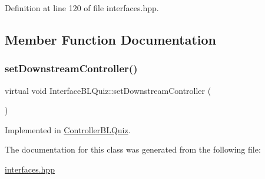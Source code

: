 Definition at line 120 of file interfaces.\+hpp.



\subsection{Member Function Documentation}
\mbox{\label{class_interface_b_l_quiz_aa2af7b48e4caf5ecdf446f64a351c86f}} 
\subsubsection{\texorpdfstring{set\+Downstream\+Controller()}{setDownstreamController()}}
{\footnotesize\ttfamily virtual void Interface\+B\+L\+Quiz\+::set\+Downstream\+Controller (\begin{DoxyParamCaption}\item[{\hyperlink{class_stub_p_r}{Stub\+PR} $\ast$}]{ }\end{DoxyParamCaption})\hspace{0.3cm}{\ttfamily [pure virtual]}}



Implemented in \hyperlink{class_controller_b_l_quiz_a77ada4c0f633482129e9179e24f6f2a8}{Controller\+B\+L\+Quiz}.



The documentation for this class was generated from the following file\+:\begin{DoxyCompactItemize}
\item 
\hyperlink{interfaces_8hpp}{interfaces.\+hpp}\end{DoxyCompactItemize}
